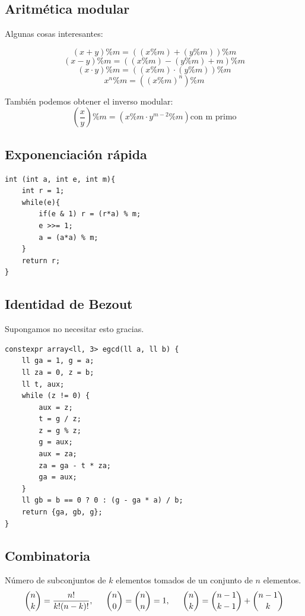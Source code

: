 \documentclass[11 pt]{article}
\begin{document}
\subsection{Aritmética modular}
Algunas cosas interesantes:

\[ (x+y) \% m = ((x \% m) + (y \% m)) \% m \]
\[ (x-y) \% m = ((x \% m) - (y \% m) + m) \% m \]
\[ (x\cdot y) \% m = ((x \% m) \cdot (y \% m)) \% m \]
\[ x^n \% m = ((x \% m)^n) \% m \]

También podemos obtener el inverso modular:
\[ \left( \frac{x}{y} \right) \% m = \left( x\%m \cdot y^{m-2} \% m \right) \text{con m primo}\]

\subsection{Exponenciación rápida}

\begin{verbatim}
int (int a, int e, int m){
    int r = 1;
    while(e){
        if(e & 1) r = (r*a) % m;
        e >>= 1;
        a = (a*a) % m;
    }
    return r;
}
\end{verbatim}

\subsection{Identidad de Bezout}
Supongamos no necesitar esto gracias.

\begin{verbatim}
constexpr array<ll, 3> egcd(ll a, ll b) {
    ll ga = 1, g = a;
    ll za = 0, z = b;
    ll t, aux;
    while (z != 0) {
        aux = z;
        t = g / z;
        z = g % z;
        g = aux;
        aux = za;
        za = ga - t * za;
        ga = aux;
    }
    ll gb = b == 0 ? 0 : (g - ga * a) / b;
    return {ga, gb, g};
}
\end{verbatim}

\subsection{Combinatoria}

Número de subconjuntos de $k$ elementos tomados de un conjunto de $n$ elementos.
\[ \binom{n}{k} = \frac{n!}{k!(n-k)!}, \hspace{15 px} 
\binom{n}{0} = \binom{n}{n} = 1, \hspace{15 px} \binom{n}{k} = 
\binom{n-1}{k-1} + \binom{n-1}{k} \] 
\end{document}
